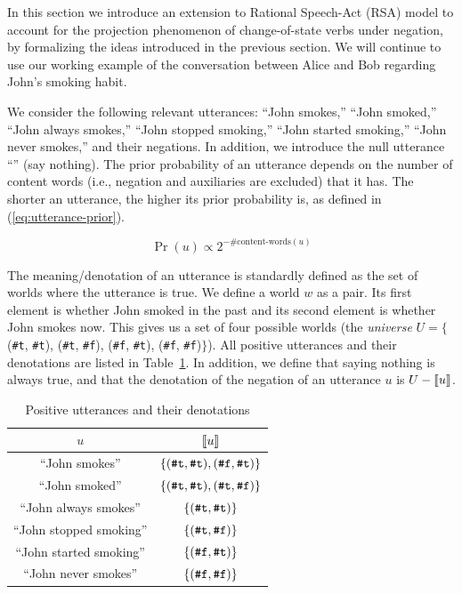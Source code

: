 
In this section we introduce an extension to Rational Speech-Act (RSA) model
\cite{FrankGoodman2012:Predicting-Pragmatic-Reasoning-,GoodmanStuhlmuller2013:Knowledge-and-I} 
to account for the projection phenomenon of change-of-state verbs under negation,
 by formalizing the ideas introduced in the previous section. 
We will continue to use our working example of the conversation between Alice and Bob
 regarding John's smoking habit.

We consider the following relevant utterances: ``John smokes,'' 
 ``John smoked,'' ``John always smokes,''
 ``John stopped smoking,'' ``John started smoking,'' 
 ``John never smokes,'' and their negations. 
In addition, we introduce the null utterance ``'' (say nothing).
The prior probability of an utterance depends on the number of content words 
 (i.e., negation and auxiliaries are excluded) that it has.
The shorter an utterance, the higher its prior probability is, as defined in 
 (\ref{eq:utterance-prior}).

\begin{equation}
\Pr(u) \propto 2^{-\#\textrm{content-words}(u)}\label{eq:utterance-prior}
\end{equation}

The meaning/denotation of an utterance is standardly defined as the set of worlds 
 where the utterance is true.
We define a world $w$ as a pair.
Its first element is whether John smoked in the past 
 and its second element is whether John smokes now. 
This gives us a set of four possible worlds (the \emph{universe} 
 $U=\{$(\verb+#t+, \verb+#t+), (\verb+#t+, \verb+#f+), (\verb+#f+, \verb+#t+), (\verb+#f+, \verb+#f+)$\}$).
All positive utterances and their denotations are listed in Table~\ref{tab:pos-utt-denotations}.
In addition, we define that saying nothing is always true, and that the denotation 
 of the negation of an utterance $u$ is $U-\llbracket \text{$u$} \rrbracket$.

\begin{table}
\centering
\begin{tabular}{cc}
$u$ &  $\llbracket \text{$u$} \rrbracket$ \\ \hline
``John smokes''  & $\{(\verb+#t+, \verb+#t+), (\verb+#f+, \verb+#t+)\}$ \\ 
``John smoked'' & $\{(\verb+#t+, \verb+#t+), (\verb+#t+, \verb+#f+)\}$ \\ 
``John always smokes'' & $\{(\verb+#t+, \verb+#t+)\}$ \\
``John stopped smoking'' & $\{(\verb+#t+, \verb+#f+)\}$ \\
``John started smoking'' & $\{(\verb+#f+, \verb+#t+)\}$ \\
``John never smokes'' & $\{(\verb+#f+, \verb+#f+)\}$ 
\end{tabular}
\caption{Positive utterances and their denotations \label{tab:pos-utt-denotations}}
\end{table}


